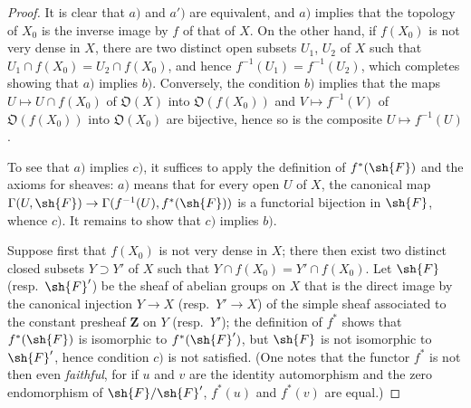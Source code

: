 \begin{proof}
It is clear that $a)$ and $a')$ are equivalent, and $a)$ implies that the topology of $X_0$ is the inverse image by $f$ of that of $X$.
On the other hand, if $f(X_0)$ is not very dense in $X$, there are two distinct open subsets $U_1$, $U_2$ of $X$ such that $U_1\cap f(X_0)=U_2\cap f(X_0)$, and hence $f^{-1}(U_1)=f^{-1}(U_2)$, which completes showing that $a)$ implies $b)$.
Conversely, the condition $b)$ implies that the maps $U\mapsto U\cap f(X_0)$ of $\mathfrak{O}(X)$ into $\mathfrak{O}(f(X_0))$ and $V\mapsto f^{-1}(V)$ of $\mathfrak{O}(f(X_0))$ into $\mathfrak{O}(X_0)$ are bijective, hence so is the composite $U\mapsto f^{-1}(U)$.

To see that $a)$ implies $c)$, it suffices to apply the definition of $f^*(\sh{F})$  and the axioms for sheaves: $a)$ means that for every open $U$ of $X$, the canonical map $\Gamma(U,\sh{F})\to\Gamma(f^{-1}(U),f^*(\sh{F}))$ is a functorial bijection in $\sh{F}$, whence $c)$.
It remains to show that $c)$ implies $b)$.

Suppose first that $f(X_0)$ is not very dense in $X$; there then exist two distinct closed subsets $Y\supset Y'$ of $X$ such that $Y\cap f(X_0)=Y'\cap f(X_0)$.
Let $\sh{F}$ (resp.\ $\sh{F}'$) be the sheaf of abelian groups on $X$ that is the direct image by the canonical injection $Y\to X$ (resp.\ $Y'\to X$) of the simple sheaf associated to the constant presheaf $\mathbf{Z}$ on $Y$ (resp.\ $Y'$); the definition of $f^*$  shows that $f^*(\sh{F})$ is isomorphic to $f^*(\sh{F}')$, but $\sh{F}$ is not isomorphic to $\sh{F}'$, hence condition $c)$ is not satisfied.
(One notes that the functor $f^*$ is not then even \emph{faithful}, for if $u$ and $v$ are the identity automorphism and the zero endomorphism of $\sh{F}/\sh{F}'$, $f^*(u)$ and $f^*(v)$ are equal.)


\end{proof}

